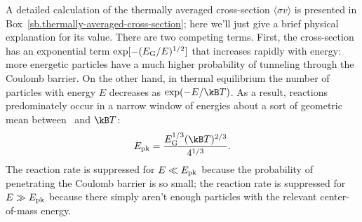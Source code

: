 A detailed calculation of the thermally averaged cross-section $\langle\sigma v\rangle$ is presented in Box~\ref{sb.thermally-averaged-cross-section}; here we'll just give a brief physical explanation for its value. There are two competing terms. First, the cross-section has an exponential term $\exp[-(E_{\mathrm{G}}/E)^{1/2}]$ that increases rapidly with energy: more energetic particles have a much higher probability of tunneling through the Coulomb barrier. On the other hand, in thermal equilibrium the number of particles with energy $E$ decreases as $\exp(-E/\kB T)$.
As a result, reactions predominately occur in a narrow window of energies about a sort of geometric mean between \EG\ and $\kB T$:
\[	\Epk = \frac{\EG^{1/3}(\kB T)^{2/3}}{4^{1/3}}. \]
The reaction rate is suppressed for $E\ll E_{\mathrm{pk}}$ because the probability of penetrating the Coulomb barrier is so small; the reaction rate is suppressed for $E\gg E_{\mathrm{pk}}$ because there simply aren't enough particles with the relevant center-of-mass energy.

